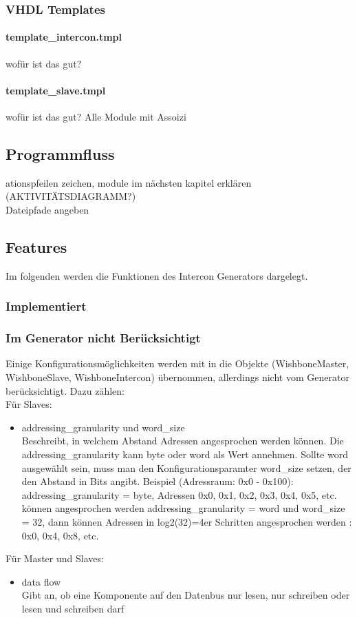 \documentclass{article}
\begin{document}
\subsubsection{VHDL Templates}
\paragraph{template\_intercon.tmpl}
wofür ist das gut?
\paragraph{template\_slave.tmpl}
wofür ist das gut?
Alle Module mit Assoizi
\subsection{Programmfluss}
ationspfeilen zeichen, module im nächsten kapitel erklären (AKTIVITÄTSDIAGRAMM?)\\
Dateipfade angeben
\subsection{Features}
Im folgenden werden die Funktionen des Intercon Generators dargelegt.
\subsubsection{Implementiert}
\subsubsection{Im Generator nicht Berücksichtigt}
Einige Konfigurationsmöglichkeiten werden mit in die Objekte (WishboneMaster, WishboneSlave, WishboneIntercon) übernommen, allerdings nicht vom Generator berücksichtigt. Dazu zählen:\\
Für Slaves:
\begin{itemize}
\item addressing\_granularity und word\_size\\
Beschreibt, in welchem Abstand Adressen angesprochen werden können.
Die addressing\_granularity kann byte oder word als Wert annehmen.
Sollte word ausgewählt sein, muss man den Konfigurationsparamter word\_size 
setzen, der den Abstand in Bits angibt. Beispiel (Adressraum: 0x0 - 0x100):\\
addressing\_granularity = byte, Adressen 0x0, 0x1, 0x2, 0x3, 0x4, 0x5, etc. können angesprochen werden
addressing\_granularity = word und word\_size = 32, dann können Adressen in log2(32)=4er Schritten angesprochen werden : 0x0, 0x4, 0x8, etc.
\end{itemize}
Für Master und Slaves:
\begin{itemize}
\item data flow\\
Gibt an, ob eine Komponente auf den Datenbus nur lesen, nur schreiben oder lesen und schreiben darf
\end{itemize}
\end{document}
